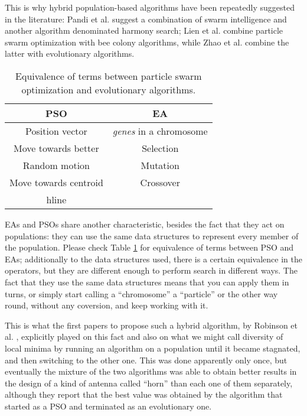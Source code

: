 This
is why hybrid population-based algorithms have been repeatedly
suggested in the literature: Pandi et al. \cite{pandi2011dynamic}
suggest a combination of swarm intelligence and another algorithm
denominated harmony search; Lien et al. \cite{lien2012hybrid} combine
particle swarm optimization with bee colony algorithms, while Zhao et
al. \cite{zhao2010hybrid} combine the latter with evolutionary
algorithms.

\begin{table}[h!tb]
    \caption{Equivalence of terms between particle swarm optimization
    and evolutionary algorithms. \label{tab:equivalence}}
\centering
\begin{tabular}{|c|c|}
  PSO & EA \\ \hline
  Position vector & {\em genes} in a chromosome \\ \hline
  Move towards better & Selection  \\ \hline
  Random motion & Mutation \\ \hline
  Move towards centroid & Crossover \\ hline
\end{tabular}
\end{table}
%
EAs and PSOs share another characteristic, besides the fact that they
act on populations: they can use the same data structures to
represent every member of the population. Please check Table
\ref{tab:equivalence} for equivalence of terms between PSO and EAs;
additionally to the data structures used, there is a certain
equivalence in the operators, but they are different enough to perform
search in different ways. The fact that they use the same data
structures means that you can apply them in turns, or simply start
calling a ``chromosome'' a ``particle'' or the other way round,
without any coversion, and keep working with it.

This is what the first papers to propose such a hybrid algorithm, by
Robinson et al. \cite{Robinson2002}, explicitly played on this
fact and also on what we might call diversity of local minima by
running an algorithm on a population until it became stagnated, and
then switching to the other one. This was done apparently only once,
but eventually the mixture of the two algorithms was able to obtain
better results in the design of a kind of antenna called ``horn'' than
each one of them separately, although they report that the best value
was obtained by the algorithm that started as a PSO and terminated as
an evolutionary one.

